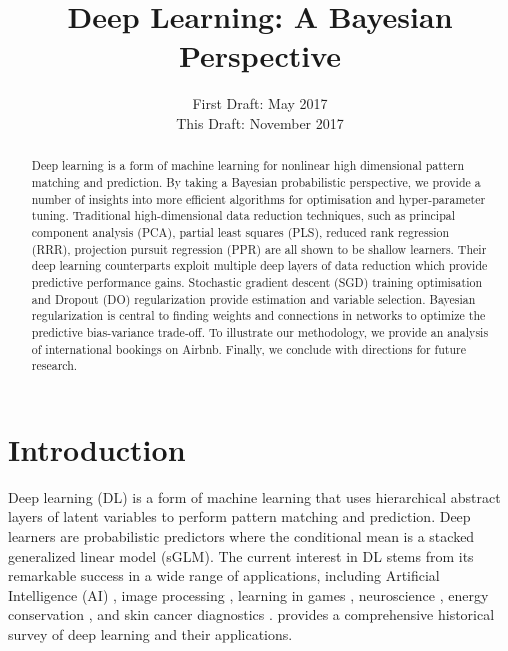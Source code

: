 \documentclass[12pt]{article}
\begin{document}
\begin{frontmatter}
\begin{keyword}[class=MSC]
\end{keyword}

\begin{keyword}
\end{keyword}
\end{frontmatter}
\fi
\ifarxiv
\title{Deep Learning: A Bayesian Perspective}%
\date{First Draft: May 2017\\
	This Draft: November 2017
}
\maketitle
\fi

\ifarxiv
\begin{abstract}
	\noindent
Deep learning is a form of machine learning for nonlinear high dimensional pattern matching and prediction.  By taking a  Bayesian probabilistic perspective, we provide a number of insights into more efficient algorithms for optimisation and hyper-parameter tuning. Traditional high-dimensional data reduction techniques, such as  principal component analysis (PCA), partial least squares (PLS), reduced rank regression (RRR), projection pursuit regression (PPR) are all shown to be shallow learners. Their deep learning counterparts exploit multiple deep layers of data reduction which provide predictive performance gains. Stochastic gradient descent (SGD) training optimisation and Dropout (DO) regularization provide estimation and variable selection. Bayesian regularization is central to finding  weights and connections in networks to optimize the predictive bias-variance trade-off. To illustrate our methodology, we provide an analysis of international bookings on Airbnb. Finally, we conclude with directions for future research.
\end{abstract}
\fi


\section{Introduction}
Deep learning (DL) is a form of machine learning that uses hierarchical abstract layers of latent variables to perform pattern matching and prediction. Deep learners are  probabilistic predictors where the conditional mean is a stacked generalized linear model (sGLM).  The current interest in DL stems from its remarkable success in a wide range of applications, including  Artificial Intelligence (AI) 
\citep{noauthor_deepmind_nodate, kubota_artificial_2017, esteva2017dermatologist}, image processing \citep{simonyan2014}, learning in games \citep{alphago}, neuroscience \citep{poggio_deep_2016}, energy conservation \citep{noauthor_deepmind_nodate}, and skin cancer diagnostics \citep{kubota_artificial_2017, esteva2017dermatologist}. \cite{schmidhuber2015deep} provides a comprehensive historical survey of deep learning and their applications.   
\end{document}
